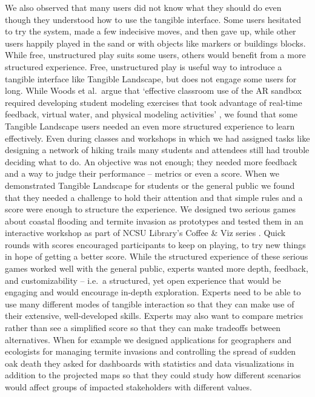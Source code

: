 \documentclass[prodmode,acmtochi]{acmsmall} %
\begin{document}
We also observed that many users
did not know what they should do 
even though they understood 
how to use the tangible interface. 
%
Some users hesitated to try the system,
made a few indecisive moves, 
and then gave up,
while other users happily played in the sand 
or with objects like markers or buildings blocks. 
%
While free, unstructured play suits some users,
others would benefit from a more structured experience. 
%
Free, unstructured play is useful way
to introduce a tangible interface like Tangible Landscape,
but does not engage some users for long.
%
While
Woods et al.~argue that 
`effective classroom use of the AR sandbox required
developing student modeling exercises that took advantage 
of real-time feedback, virtual water, and physical modeling activities'
\cite{Woods2016},
we found that some Tangible Landscape users needed 
an even more structured experience
to learn effectively.
%
Even during classes and workshops
in which we had assigned tasks
like designing a network of hiking trails 
many students and attendees 
still had trouble deciding what to do. 
%
An objective was not enough; 
they needed more feedback 
and a way to judge their performance 
-- metrics or even a score. 
%
When we demonstrated Tangible Landscape 
for students or the general public
we found that they needed 
a challenge to hold their attention and 
that simple rules and a score were enough
to structure the experience. 
%
We designed two serious games 
about coastal flooding and termite invasion as prototypes
and tested them in an interactive workshop 
as part of NCSU Library's Coffee \& Viz series
\cite{Harmon2016d}.
%
Quick rounds with scores encouraged participants to 
keep on playing, to try new things in hope of getting a better score.
%
While the structured experience of these serious games
worked well with the general public,
experts wanted more depth, feedback, and customizability 
-- i.e.~a structured, yet open experience
that would be engaging and 
would encourage in-depth exploration.
%
Experts need to be able to 
use many different modes of tangible interaction
so that they can make use of their 
extensive, well-developed skills.
%
Experts may also want to compare metrics 
rather than see a simplified score
so that they can make tradeoffs between alternatives.
%
When for example 
we designed applications for geographers and ecologists 
for managing termite invasions 
and controlling the spread of sudden oak death
they asked for dashboards with statistics and data visualizations 
in addition to the projected maps
so that they could study how different scenarios would affect 
groups of impacted stakeholders with different values.  
\end{document}
